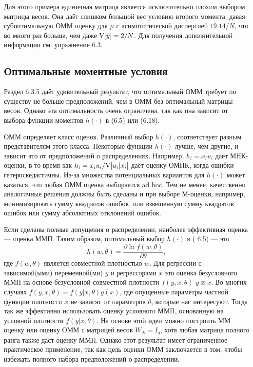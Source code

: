 Для этого примера единичная матрица является исключительно плохим выбором матрицы весов. Она даёт слишком большой вес условию второго момента, давая субоптимальную ОММ оценку для $\mu$  с асимптотической дисперсией $19.14/N$, что во много раз больше, чем даже $\mathrm{V}[\bar{y}]=2/N$. Для получения дополнительной информации см. упражнение 6.3.

\subsection{Оптимальные моментные условия}

Раздел 6.3.5 даёт удивительный результат, что оптимальный ОММ требует по существу не больше предположений, чем в ОММ без оптимальный матрицы весов. Однако эта оптимальность очень ограничена, так как она зависит от выбора функции моментов $h(\cdot)$ в (6.5) или (6.18).

ОММ определяет класс оценок.  Различный выбор $h(\cdot)$, соответствует разным представителям этого класса. Некоторые функции $h(\cdot)$ лучше, чем другие, и зависит это от предположений о распределениях. Например, $h_i=x_i u_i$ даёт МНК-оценки, в то время как $h_i=x_i u_i / \mathrm{V}[u_i|x_i]$ даёт оценку ОМНК, когда ошибки гетероскедастичны. Из-за множества потенциальных вариантов для $h(\cdot)$ может казаться, что любая ОММ оценка выбирается ad hoc. Тем не менее, качественно аналогичные решения должны быть сделаны и при выборе М-оценки, например, минимизировать сумму квадратов ошибок, или взвешенную сумму квадратов ошибок или сумму абсолютных отклонений ошибок.

Если сделаны полные допущения о распределении, наиболее эффективная оценка --- оценка ММП. Таким образом, оптимальный выбор $h(\cdot)$ в ( 6.5) --- это
\[
h(w,\theta)=\frac{ \partial \ln f(w,\theta)}{\partial \theta},
\]
где $f(w,\theta)$ является совместной плотностью $w$. Для регрессии с зависимой(ыми) переменной(ми) $y$ и регрессорами $x$ это оценка безусловного ММП на основе безусловной совместной плотности $f(y,x,\theta)$ $y$ и $x$. Во многих случаях $f(y,x,\theta)=f(y|x,\theta)g(x)$, где опущенные параметры частной функции плотности $x$ не зависят от параметров $\theta$, которые нас интересуют. Тогда так же эффективно использовать оценку условного ММП, основанную на условной плотности $f(y|x,\theta)$. На основе этой идеи можно построить ММ оценку или оценку ОММ с матрицей весов $W_N=I_q$, хотя любая матрица полного ранга также даст оценку ММП. Однако этот результат имеет ограниченное практическое применение, так как цель оценки ОММ заключается в том, чтобы избежать полного набора предположений о распределении.

